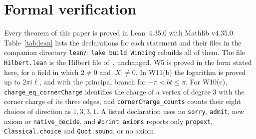\documentclass[11pt,a4paper]{article}
\theoremstyle{definition}
\begin{document}
\section{Formal verification}
Every theorem of this paper is proved in Lean~4.35.0 with Mathlib v4.35.0. Table~\ref{tab:lean} lists the declarations for each statement and their files in the companion directory \texttt{lean/}; \texttt{lake build Winding} rebuilds all of them. The file \texttt{Hilbert.lean} is the Hilbert file of~\cite{unifier}, unchanged. W5 is proved in the form stated here, for a field in which $2\ne0$ and $|X|\ne0$. In W11(b) the logarithm is proved up to $2\pi i\ell$, and with the principal branch for $-\pi<bt\le\pi$. For W10(c), \texttt{charge\_eq\_cornerCharge} identifies the charge of a vertex of degree $3$ with the corner charge of its three edges, and \texttt{cornerCharge\_counts} counts their eight choices of direction as $1,3,3,1$. A listed declaration uses no \texttt{sorry}, \texttt{admit}, new axiom or \texttt{native\_decide}, and \texttt{\#print axioms} reports only \texttt{propext}, \texttt{Classical.choice} and \texttt{Quot.sound}, or no axiom.
\end{document}
